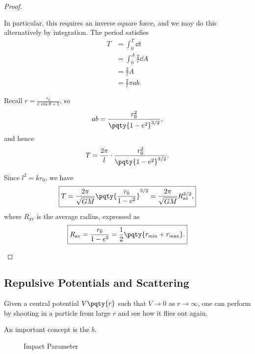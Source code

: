 \begin{proof}
\begin{enumerate}
        In particular, this requires an inverse square force, and we may do this alternatively by integration. The period satisfies
        \begin{subequations}\begin{align}
            T &= \int_{0}^{T} \dd{t} \\
            &= \int_{0}^{A} \frac{2}{l} \dd{A} \\
            &= \frac{2}{l} A \\
            &= \frac{2}{l} \pi ab.
        \end{align}\end{subequations}

        Recall \(r = \frac{r_0}{e \cos \theta + 1}\), so
        \begin{equation}
            ab = \frac{r_0^2}{\pqty{1 - e^2}^{3 / 2}},
        \end{equation}
        and hence
        \begin{equation}
            T = \frac{2 \pi}{l} \cdot \frac{r_0^2}{\pqty{1 - e^2}^{3 / 2}}.
        \end{equation}

        Since \(l^2 = k r_0\), we have
        \begin{equation}
            \boxed{T = \frac{2\pi}{\sqrt{GM}} \pqty{\frac{r_0}{1 - e^2}}^{3 / 2} = \frac{2\pi}{\sqrt{GM}} R_{\text{av}}^{3 / 2},}
        \end{equation}
        where \(R_{\text{av}}\) is the average radius, expressed as
        \begin{equation}
            \boxed{R_{\text{av}} = \frac{r_0}{1 - e^2} = \frac{1}{2} \pqty{r_{\min} + r_{\max}}.}
        \end{equation}
    \end{enumerate}
\end{proof}

\subsection{Repulsive Potentials and Scattering}

Given a central potential \(V\pqty{r}\) such that \(V \to 0\) as \(r \to \infty\), one can perform  by shooting in a particle from large \(r\) and see how it flies out again.

An important concept is the  \(b\).

\begin{figure}[ht!]
    \centering

    \caption{Impact Parameter}
    \label{fig:impact-parameter}%
\end{figure}

